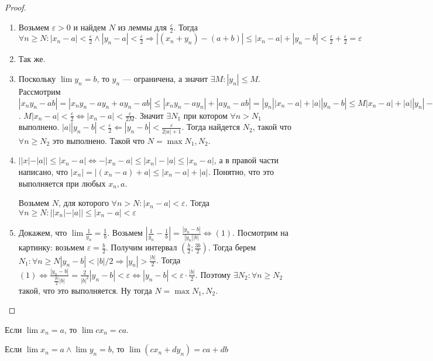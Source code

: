\begin{proof}
    \slashn
    \begin{enumerate}
        \item Возьмем $\varepsilon > 0$ и найдем  $N$ из леммы для  $\frac{\varepsilon}{2}$. Тогда $\forall n \ge N: |x_n-a| < \frac{\varepsilon}{2} \land |y_n-a| <  \frac{\varepsilon}{2} \Rightarrow |(x_n+y_n) - (a+b)| \le |x_n - a| + |y_n-b| < \frac{\varepsilon}{2} + \frac{\varepsilon}{2} = \varepsilon$
        \item Так же.
        \item Поскольку $\lim y_n = b$, то $y_n$ --- ограничена, а значит  $\exists M: |y_n| \le M$. Рассмотрим $|x_ny_n - ab| = |x_ny_n - ay_n + ay_n - ab| \le |x_ny_n - ay_n| + |ay_n - ab| = |y_n| |x_n-a| + |a| |y_n-b| \le M |x_n-a| + |a| |y_n|-b$. $M |x_n - a| < \frac{\varepsilon}{2} \iff |x_n - a| < \frac{\varepsilon}{2M}$. Значит $\exists N_1$ при котором $\forall n > N_1$ выполнено.  $|a| |y_n - b| < \frac{\varepsilon}{2} \Leftarrow |y_n - b| < \frac{\varepsilon}{2|a|+1}$. Тогда найдется $N_2$, такой что  $\forall n \ge N_2$ это выполнено. Такой что $N = \max{N_1, N_2}$.
        \item $||x|-|a|| \le |x_n-a| \iff -|x_n-a| \le |x_n| - |a| \le |x_n-a|$, а в правой части написано, что $|x_n| = |(x_n-a)+a| \le |x_n-a| + |a|$. Понятно, что это выполняется при любых $x_n, a$. 

            Возьмем  $N$, для которого  $\forall n > N: |x_n - a| < \varepsilon$. Тогда  $\forall n \ge N: ||x_n|-|a|| \le |x_n-a| < \varepsilon$
        \item Докажем, что $\lim \frac{1}{y_n} = \frac{1}{b}$.  Возьмем  $|\frac{1}{y_n} - \frac{1}{b}| = \frac{|y_n-b|}{|y_n||b|} \iff (1)$. Посмотрим на картинку: возьмем $\varepsilon = \frac{b}{2}$. Получим интервал $(\frac{b}{2}; \frac{3b}{2})$. Тогда берем $N_1: \forall n \ge N |y_n-b| < |b|/2 \Rightarrow |y_n| > \frac{|b|}{2}$. Тогда $(1) \iff \frac{|y_n-b|}{\frac{|b|}{2}|b|} = \frac{2}{|b|^2}|y_n-b|<\varepsilon \iff |y_n-b| < \varepsilon \cdot \frac{|b|}{2}$. Поэтому $\exists N_2: \forall n \ge N_2$ такой, что это выполняется. Ну тогда $N=\max{N_1, N_2}$.
    \end{enumerate}
\end{proof}
\begin{consequence}
   Если $\lim x_n = a$, то  $\lim cx_n = ca$. 
\end{consequence}
\begin{consequence}
    Если $\lim x_n=a \land \lim y_n = b$, то $\lim(cx_n+dy_n) = ca+db$
\end{consequence}

